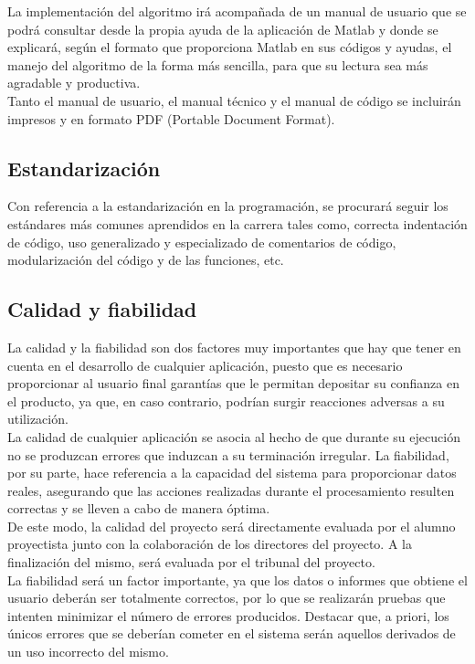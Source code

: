 			La implementación del algoritmo irá acompañada de un manual de usuario que se podrá consultar desde la propia ayuda de la aplicación de Matlab y donde se explicará, según el formato que proporciona Matlab en sus códigos y ayudas, el manejo del algoritmo de la forma más sencilla, para que su lectura sea más agradable y productiva.\\

			Tanto el manual de usuario, el manual técnico y el manual de código se incluirán impresos y en formato PDF (Portable Document Format).
		
		\subsection{Estandarización}
		
			Con referencia a la estandarización en la programación, se procurará seguir los estándares más comunes aprendidos en la carrera tales como, correcta indentación de código, uso generalizado y especializado de comentarios de código, modularización del código y de las funciones, etc.
		
		\subsection{Calidad y fiabilidad}
		
			La calidad y la fiabilidad son dos factores muy importantes que hay que tener en cuenta en el desarrollo de cualquier aplicación, puesto que es necesario proporcionar al usuario final garantías que le permitan depositar su confianza en el producto, ya que, en caso contrario, podrían surgir reacciones adversas a su utilización.\\

			La calidad de cualquier aplicación se asocia al hecho de que durante su ejecución no se produzcan errores que induzcan a su terminación irregular. La fiabilidad, por su parte, hace referencia a la capacidad del sistema para proporcionar datos reales, asegurando que las acciones realizadas durante el procesamiento resulten correctas y se lleven a cabo de manera óptima.\\

			De este modo, la calidad del proyecto será directamente evaluada por el alumno proyectista junto con la colaboración de los directores del proyecto. A la finalización del mismo, será evaluada por el tribunal del proyecto.\\

			La fiabilidad será un factor importante, ya que los datos o informes que obtiene el usuario deberán ser totalmente correctos, por lo que se realizarán pruebas que intenten minimizar el número de errores producidos. Destacar que, a priori, los únicos errores que se deberían cometer en el sistema serán aquellos derivados de un uso incorrecto del mismo.
		
